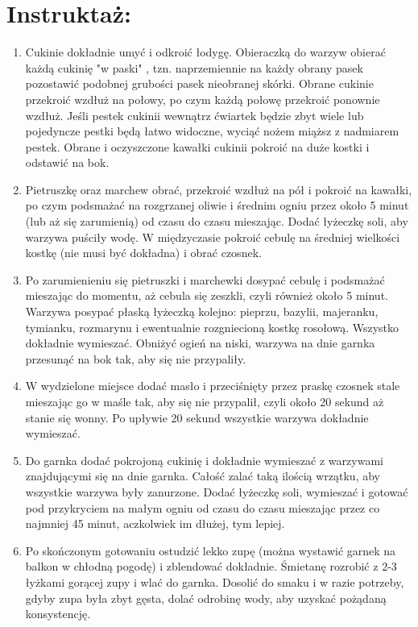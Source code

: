 \documentclass[a4paper,10pt]{book}
\begin{document}
\vspace{0.5cm} 

\section*{Instruktaż:}
\begin{enumerate}
    \item Cukinie dokładnie umyć i odkroić łodygę. Obieraczką do warzyw obierać każdą cukinię "w paski" , tzn. naprzemiennie na każdy obrany pasek pozostawić podobnej grubości pasek nieobranej skórki. Obrane cukinie przekroić wzdłuż na połowy, po czym każdą połowę przekroić ponownie wzdłuż. Jeśli pestek cukinii wewnątrz ćwiartek będzie zbyt wiele lub pojedyncze pestki będą łatwo widoczne, wyciąć nożem miąższ z nadmiarem pestek. Obrane i oczyszczone kawałki cukinii pokroić na duże kostki i odstawić na bok.
    \item Pietruszkę oraz marchew obrać, przekroić wzdłuż na pół i pokroić na kawałki, po czym podsmażać na rozgrzanej oliwie i średnim ogniu przez około 5 minut (lub aż się zarumienią) od czasu do czasu mieszając. Dodać łyżeczkę soli, aby warzywa puściły wodę. W międzyczasie pokroić cebulę na średniej wielkości kostkę (nie musi być dokładna) i obrać czosnek.
    \item Po zarumienieniu się pietruszki i marchewki dosypać cebulę i podsmażać mieszając do momentu, aż cebula się zeszkli, czyli również około 5 minut. Warzywa posypać płaską łyżeczką kolejno: pieprzu, bazylii, majeranku, tymianku, rozmarynu i ewentualnie rozgniecioną kostkę rosołową. Wszystko dokładnie wymieszać. Obniżyć ogień na niski, warzywa na dnie garnka przesunąć na bok tak, aby się nie przypaliły.
    \item W wydzielone miejsce dodać masło i przeciśnięty przez praskę czosnek stale mieszając go w maśle tak, aby się nie przypalił, czyli około 20 sekund aż stanie się wonny. Po upływie 20 sekund wszystkie warzywa dokładnie wymieszać.
    \item Do garnka dodać pokrojoną cukinię i dokładnie wymieszać z warzywami znajdującymi się na dnie garnka. Całość zalać taką ilością wrzątku, aby wszystkie warzywa były zanurzone. Dodać łyżeczkę soli, wymieszać i gotować pod przykryciem na małym ogniu od czasu do czasu mieszając przez co najmniej 45 minut, aczkolwiek im dłużej, tym lepiej.
    \item Po skończonym gotowaniu ostudzić lekko zupę (można wystawić garnek na balkon w chłodną pogodę) i zblendować dokładnie. Śmietanę rozrobić z 2-3 łyżkami gorącej zupy i wlać do garnka. Dosolić do smaku i w razie potrzeby, gdyby zupa była zbyt gęsta, dolać odrobinę wody, aby uzyskać pożądaną konsystencję. 
\end{enumerate}
\end{document}
